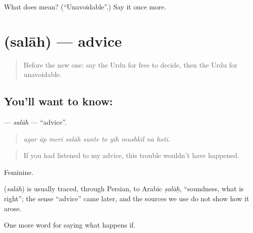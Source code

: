 \begin{tcolorbox}[breakable,colback=teal!4,colframe=teal!35!black,title={Before you move on}]
What does  mean? (\textquotedblleft{}Unavoidable\textquotedblright{}.) Say it once more.
\end{tcolorbox}
\section[\texorpdfstring{\ur{صلاح} (salāh)}{صلاح (salāh)}]{ (salāh) — advice}

\label{lesson:UR-C539-salah}



\begin{quote}
Before the new one: say the Urdu for free to decide, then the Urdu for unavoidable.
\end{quote}

\subsection*{You'll want to know: }
\textbf{} — \emph{salāh} — \textquotedblleft{}advice\textquotedblright{}.

\begin{quote}
         
\end{quote}

\begin{quote}
\emph{agar āp merī salāh sunte to yih mushkil na hotī.}
\end{quote}

\begin{quote}
If you had listened to my advice, this trouble wouldn't have happened.
\end{quote}

Feminine.

\begin{cousinweb}
\textbf{} (\emph{salāh}) is usually traced, through Persian, to Arabic \emph{ṣalāḥ}, \textquotedblleft{}soundness, what is right\textquotedblright{}; the sense \textquotedblleft{}advice\textquotedblright{} came later, and the sources we use do not show how it arose.
\end{cousinweb}

\begin{grammarlens}[title={What you've built}]
One more word for saying what happens if.
\end{grammarlens}

